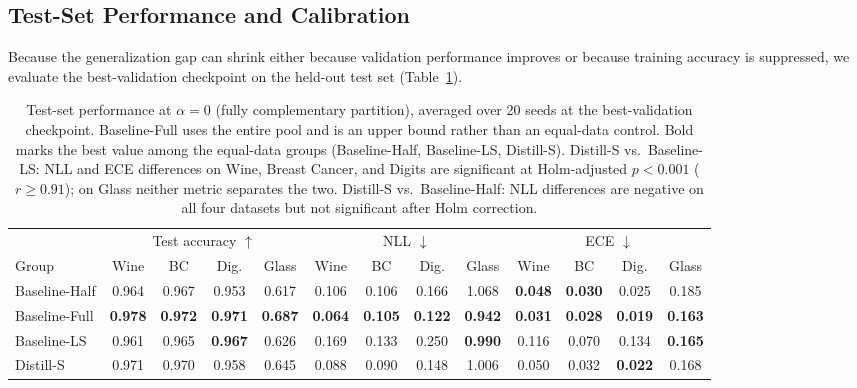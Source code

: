 \documentclass[a4paper,fleqn]{cas-dc}
\begin{document}
\subsection{Test-Set Performance and Calibration}
\label{sec:test}

Because the generalization gap can shrink either because validation
performance improves or because training accuracy is suppressed, we
evaluate the best-validation checkpoint on the held-out test set
(Table~\ref{tab:test_metrics}).

\begin{table}[t]
\centering
\caption{Test-set performance at $\alpha{=}0$ (fully complementary
         partition), averaged over 20 seeds at the best-validation
         checkpoint. Baseline-Full uses the entire pool and is an upper
         bound rather than an equal-data control. Bold marks the best
         value among the equal-data groups (Baseline-Half, Baseline-LS,
         Distill-S). Distill-S vs.\ Baseline-LS: NLL and ECE differences
         on Wine, Breast Cancer, and Digits are significant at
         Holm-adjusted $p<0.001$ ($r \ge 0.91$); on Glass neither metric
         separates the two. Distill-S vs.\ Baseline-Half: NLL differences
         are negative on all four datasets but not significant after
         Holm correction.}
\label{tab:test_metrics}
\setlength{\tabcolsep}{4.5pt}
\begin{tabular}{l cccc cccc cccc}
\toprule
 & \multicolumn{4}{c}{Test accuracy $\uparrow$}
 & \multicolumn{4}{c}{NLL $\downarrow$}
 & \multicolumn{4}{c}{ECE $\downarrow$} \\
Group & Wine & BC & Dig. & Glass
      & Wine & BC & Dig. & Glass
      & Wine & BC & Dig. & Glass \\
\midrule
Baseline-Half & 0.964 & 0.967 & 0.953 & 0.617
              & 0.106 & 0.106 & 0.166 & 1.068
              & \textbf{0.048} & \textbf{0.030} & 0.025 & 0.185 \\
Baseline-Full & \textbf{0.978} & \textbf{0.972} & \textbf{0.971} & \textbf{0.687}
              & \textbf{0.064} & \textbf{0.105} & \textbf{0.122} & \textbf{0.942}
              & \textbf{0.031} & \textbf{0.028} & \textbf{0.019} & \textbf{0.163} \\
Baseline-LS   & 0.961 & 0.965 & \textbf{0.967} & 0.626
              & 0.169 & 0.133 & 0.250 & \textbf{0.990}
              & 0.116 & 0.070 & 0.134 & \textbf{0.165} \\
Distill-S     & 0.971 & 0.970 & 0.958 & 0.645
              & 0.088 & 0.090 & 0.148 & 1.006
              & 0.050 & 0.032 & \textbf{0.022} & 0.168 \\
\bottomrule
\end{tabular}
\end{table}
\end{document}
